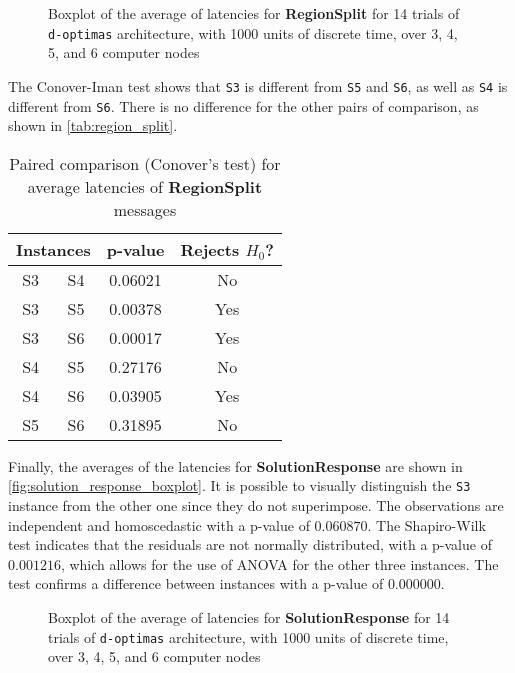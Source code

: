 \documentclass[preprint,12pt]{elsarticle}
\begin{document}
\begin{figure}[ht!]
    \centering
    
    \caption{Boxplot of the average of latencies for \textbf{RegionSplit} for 14 trials of \texttt{d-optimas} architecture, with 1000 units of discrete time, over 3, 4, 5, and 6 computer nodes}
    \label{fig:region_split_boxplot}
\end{figure}

The Conover-Iman test shows that \texttt{S3} is different from \texttt{S5} and \texttt{S6}, as well as \texttt{S4} is different from \texttt{S6}. There is no difference for the other pairs of comparison, as shown in \autoref{tab:region_split}.

\begin{table}[ht!]
    \centering
    \caption{Paired comparison (Conover's test) for average latencies of 
 \textbf{RegionSplit} messages}
    \begin{tabular}{cccc}
    \toprule
    \multicolumn{2}{c}{\textbf{Instances}} & \textbf{p-value} & \textbf{Rejects $H_0$?}\\
    \midrule
       S3  &  S4  &  0.06021  &  No \\
       S3  &  S5  &  0.00378  &  Yes \\
       S3  &  S6  &  0.00017  &  Yes \\
       S4  &  S5  &  0.27176  &  No \\
       S4  &  S6  &  0.03905  &  Yes \\
       S5  &  S6  &  0.31895  &  No \\
     \bottomrule
    \end{tabular}
    \label{tab:region_split}
\end{table}


Finally, the averages of the latencies for \textbf{SolutionResponse} are shown in \autoref{fig:solution_response_boxplot}. It is possible to visually distinguish the \texttt{S3} instance from the other one since they do not superimpose. The observations are independent and homoscedastic with a p-value of $ 0.060870$. The Shapiro-Wilk test indicates that the residuals are not normally distributed, with a p-value of $0.001216$, which allows for the use of ANOVA for the other three instances. The test confirms a difference between instances with a p-value of $0.000000$.

\begin{figure}[ht!]
    \centering
    
    \caption{Boxplot of the average of latencies for \textbf{SolutionResponse} for 14 trials of \texttt{d-optimas} architecture, with 1000 units of discrete time, over 3, 4, 5, and 6 computer nodes}
    \label{fig:solution_response_boxplot}
\end{figure}
\end{document}
